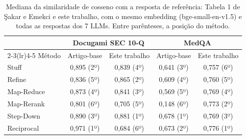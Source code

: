 \begin{table}[!t]
\centering
\footnotesize
\setlength{\tabcolsep}{4pt}
\caption{Mediana da similaridade de cosseno com a resposta de referência: Tabela 1 de Şakar e Emekci \cite{sakar2025rag} e este trabalho, com o mesmo embedding (bge-small-en-v1.5) e todas as respostas dos 7 LLMs. Entre parênteses, a posição do método.}
\label{tab:ancora}
\begin{tabular}{lcccc}
\toprule
 & \multicolumn{2}{c}{Docugami SEC 10-Q} & \multicolumn{2}{c}{MedQA} \\
\cmidrule(lr){2-3}\cmidrule(lr){4-5}
Método & Artigo-base & Este trabalho & Artigo-base & Este trabalho \\
\midrule
Stuff & 0,895 (2º) & 0,839 (4º) & 0,641 (3º) & 0,757 (6º) \\
Refine & 0,836 (5º) & 0,865 (2º) & 0,609 (4º) & 0,760 (5º) \\
Map-Reduce & 0,873 (4º) & 0,841 (3º) & 0,569 (5º) & 0,769 (4º) \\
Map-Rerank & 0,801 (6º) & 0,705 (5º) & 0,148 (6º) & 0,773 (2º) \\
Step-Down & 0,890 (3º) & 0,881 (1º) & 0,678 (1º) & 0,769 (3º) \\
Reciprocal & 0,971 (1º) & 0,684 (6º) & 0,673 (2º) & 0,776 (1º) \\
\bottomrule
\end{tabular}
\end{table}
